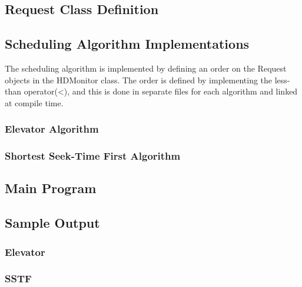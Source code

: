 \documentclass{report}
\begin{document}
\subsection{Request Class Definition}

\subsection{Scheduling Algorithm Implementations}
The scheduling algorithm is implemented by defining an order on the Request objects in the
HDMonitor class. The order is defined by implementing the less-than operator(<), and this
is done in separate files for each algorithm and linked at compile time.
\subsubsection{Elevator Algorithm}

\subsubsection{Shortest Seek-Time First Algorithm}

\subsection{Main Program}

\subsection{Sample Output}
\subsubsection{Elevator}

\subsubsection{SSTF}


\tableofcontents %
\end{document}
